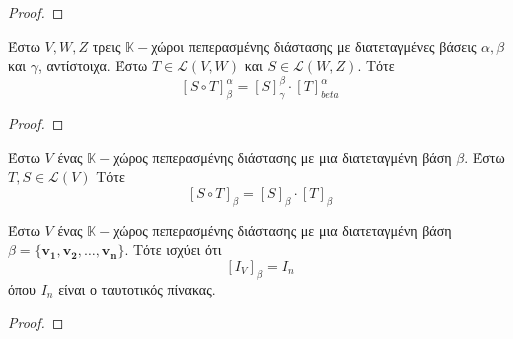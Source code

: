 \begin{proof}
\end{proof}

\begin{thm}
  Έστω $ V,W,Z $ τρεις $ \mathbb{K}- $χώροι πεπερασμένης διάστασης με διατεταγμένες 
  βάσεις $ \alpha, \beta $ και $\gamma$, αντίστοιχα. Έστω $ T \in \mathcal{L}(V,W) $ 
  και $ S \in \mathcal{L}(W,Z) $. Τότε
  \[
    [S \circ T]_{\beta}^{\alpha} = [S]_{\gamma}^{\beta} \cdot [T]_{beta}^{\alpha}
  \] 
\end{thm}

\begin{proof}
\end{proof}

\begin{cor}
  Έστω $V$ ένας $ \mathbb{K}- $χώρος πεπερασμένης διάστασης με μια διατεταγμένη βάση 
  $\beta$. Έστω $ T,S \in \mathcal{L}(V) $ Τότε
  \[
    [S \circ T]_{\beta} = [S]_{\beta} \cdot [T]_{\beta}
  \] 
\end{cor}

\begin{thm}
  Έστω $V$ ένας $ \mathbb{K}- $χώρος πεπερασμένης διάστασης με μια διατεταγμένη βάση 
  $ \beta = \{ \mathbf{v_{1}}, \mathbf{v_{2}}, \ldots, \mathbf{v_{n}} \} $. Τότε 
  ισχύει ότι 
  \[
    [I_{V}]_{\beta} = I_{n}
  \] 
  όπου $ I_{n} $ είναι ο ταυτοτικός πίνακας.
\end{thm}

\begin{proof}
\end{proof}

